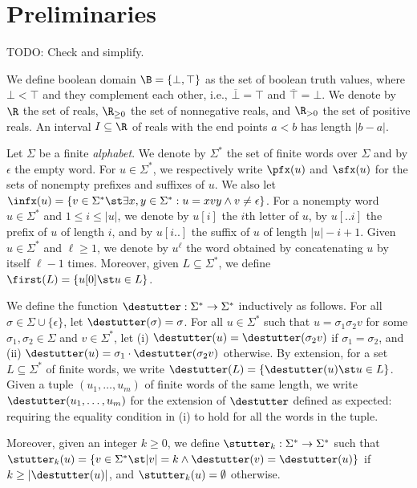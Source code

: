 \section{Preliminaries} \label{sec:preliminaries}

\alert{TODO: Check and simplify.}

We define boolean domain $\B = \{ \bot, \top \}$ as the set of boolean truth values, where $\bot < \top$ and they 
complement each other, i.e., $\overline{\bot} = \top$ and $\overline{\top} = \bot$.
%
We denote by $\R$ the set of reals, $\R_{\geq 0}$ the set of nonnegative reals, and $\R_{> 0}$ the 
set of positive reals.
%
An interval $I \subseteq \R$ of reals with the end points $a < b$ has length $|b-a|$.

Let $\Sigma$ be a finite {\em alphabet}.
%
We denote by $\Sigma^*$ the set of finite words over $\Sigma$ and by $\epsilon$ the empty word.
%
For $u \in \Sigma^*$, we respectively write $\pfx(u)$ and $\sfx(u)$ for the sets of nonempty prefixes 
and suffixes of $u$.
%
We also let $\infx(u) = \{v \in \Sigma^* \st \exists x,y \in \Sigma^* : u = xvy \land v \neq \epsilon\}$.
%
For a nonempty word $u \in \Sigma^*$ and $1 \leq i \leq |u|$, we denote by $u[i]$ the $i$th letter of 
$u$, by $u[..i]$ the prefix of $u$ of length $i$, and by $u[i..]$ the suffix of $u$ of length $|u| - i + 1$. 
%
Given $u \in \Sigma^*$ and $\ell \geq 1$, we denote by $u^\ell$ the word obtained by concatenating $u$ by itself $\ell - 1$ times.
Moreover, given $L \subseteq \Sigma^*$, we define $\first(L) = \{ u[0] \st u \in L\}$.

We define the function $\destutter : \Sigma^* \to \Sigma^*$ inductively as follows.
For all $\sigma \in \Sigma \cup \{\epsilon\}$, let $\destutter(\sigma) = \sigma$.
%
For all $u \in \Sigma^*$ such that $u = \sigma_1 \sigma_2 v$ for some $\sigma_1,\sigma_2 \in 
\Sigma$ and $v \in \Sigma^*$, let (i) $\destutter(u) = \destutter(\sigma_2 v)$ if $\sigma_1 = 
\sigma_2$, and (ii) $\destutter(u) = \sigma_1 \cdot \destutter(\sigma_2 v)$ otherwise.
%
By extension, for a set $L \subseteq \Sigma^*$ of finite words, we write $\destutter(L) = 
\{\destutter(u) \st u \in L\}$.
%
Given a tuple $(u_1, \ldots, u_m)$ of finite words of the same length, we write $\destutter(u_1, \ldots, u_m)$ for the extension of $\destutter$ defined as expected: requiring the equality condition in (i) to hold for all the words in the tuple.


Moreover, given an integer $k \geq 0$, we define $\stutter_k : \Sigma^* \to \Sigma^*$ such that $\stutter_k(u) = \{v \in \Sigma^* \st |v| = k \land \destutter(v) = \destutter(u)\}$ if $k \geq |\destutter(u)|$, and $\stutter_k(u) = \emptyset$ otherwise.


